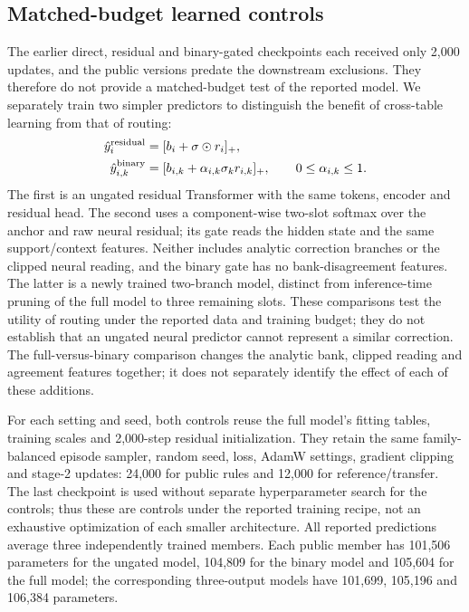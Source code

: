 \subsection{Matched-budget learned controls}
\label{app:matched-controls}

The earlier direct, residual and binary-gated checkpoints each received only
2,000 updates, and the public versions predate the downstream exclusions.
They therefore do not provide a matched-budget test of the reported model.
We separately train two simpler predictors to distinguish the benefit of
cross-table learning from that of routing:
\begin{align}
 \hat y_i^{\rm residual}&=[b_i+\sigma\odot r_i]_+,\\
 \hat y_{i,k}^{\rm binary}&=[b_{i,k}+\alpha_{i,k}\sigma_k r_{i,k}]_+,
 \qquad 0\leq\alpha_{i,k}\leq1.
\end{align}
The first is an ungated residual Transformer with the same tokens, encoder and
residual head. The second uses a component-wise two-slot softmax over the
anchor and raw neural residual; its gate reads the hidden state and the same
support/context features. Neither includes analytic correction branches or
the clipped neural reading, and the binary gate has no bank-disagreement
features. The latter is a newly trained two-branch model, distinct from
inference-time pruning of the full model to three remaining slots.
These comparisons test the utility of routing under the reported data and
training budget; they do not establish that an ungated neural predictor
cannot represent a similar correction. The full-versus-binary comparison
changes the analytic bank, clipped reading and agreement features together;
it does not separately identify the effect of each of these additions.

For each setting and seed, both controls reuse the full model's fitting tables,
training scales and 2,000-step residual initialization. They retain the same
family-balanced episode sampler, random seed, loss, AdamW settings, gradient
clipping and stage-2 updates: 24,000 for public rules and 12,000 for
reference/transfer. The last checkpoint is used without separate hyperparameter
search for the controls; thus these are controls under the reported training
recipe, not an exhaustive optimization of each smaller architecture.
All reported predictions average three independently trained members.
Each public member has 101,506 parameters for the ungated model, 104,809 for
the binary model and 105,604 for the full model; the corresponding three-output
models have 101,699, 105,196 and 106,384 parameters.

